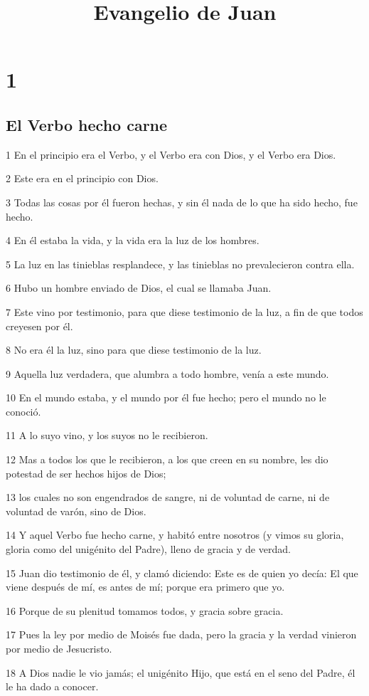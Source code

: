 
\title{Evangelio de Juan}

\chapter{1}

\section*{El Verbo hecho carne}

\par 1 En el principio era el Verbo, y el Verbo era con Dios, y el Verbo era Dios.
\par 2 Este era en el principio con Dios.
\par 3 Todas las cosas por él fueron hechas, y sin él nada de lo que ha sido hecho, fue hecho.
\par 4 En él estaba la vida, y la vida era la luz de los hombres.
\par 5 La luz en las tinieblas resplandece, y las tinieblas no prevalecieron contra ella.
\par 6 Hubo un hombre enviado de Dios, el cual se llamaba Juan.
\par 7 Este vino por testimonio, para que diese testimonio de la luz, a fin de que todos creyesen por él.
\par 8 No era él la luz, sino para que diese testimonio de la luz.
\par 9 Aquella luz verdadera, que alumbra a todo hombre, venía a este mundo.
\par 10 En el mundo estaba, y el mundo por él fue hecho; pero el mundo no le conoció.
\par 11 A lo suyo vino, y los suyos no le recibieron.
\par 12 Mas a todos los que le recibieron, a los que creen en su nombre, les dio potestad de ser hechos hijos de Dios;
\par 13 los cuales no son engendrados de sangre, ni de voluntad de carne, ni de voluntad de varón, sino de Dios.
\par 14 Y aquel Verbo fue hecho carne, y habitó entre nosotros (y vimos su gloria, gloria como del unigénito del Padre), lleno de gracia y de verdad.
\par 15 Juan dio testimonio de él, y clamó diciendo: Este es de quien yo decía: El que viene después de mí, es antes de mí; porque era primero que yo.
\par 16 Porque de su plenitud tomamos todos, y gracia sobre gracia.
\par 17 Pues la ley por medio de Moisés fue dada, pero la gracia y la verdad vinieron por medio de Jesucristo.
\par 18 A Dios nadie le vio jamás; el unigénito Hijo, que está en el seno del Padre, él le ha dado a conocer.

